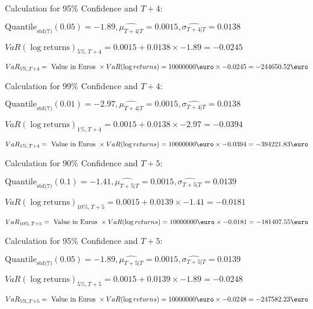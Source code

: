 Calculation for 95\% Confidence and $T+4$:

\indent\indent $\text{Quantile}_\text{std(7)}(0.05) = -1.89,\hat{\mu_{T+4|T}} = 0.0015, \hat{\sigma_{T+4|T}} = 0.0138$

\indent\indent $VaR(\log \text{returns})_{5\%, T + 4} = 0.0015 + 0.0138\times-1.89 = -0.0245$

\indent\indent $VaR_{5\%, T + 4} = \text{ Value in Euros } \times VaR(\log returns) = 10 000 000 \text{\euro} \times-0.0245 = -244650.52 \text{\euro}$\newline




Calculation for 99\% Confidence and $T+4$:

\indent\indent $\text{Quantile}_\text{std(7)}(0.01) = -2.97,\hat{\mu_{T+4|T}} = 0.0015, \hat{\sigma_{T+4|T}} = 0.0138$

\indent\indent $VaR(\log \text{returns})_{1\%, T + 4} = 0.0015 + 0.0138\times-2.97 = -0.0394$

\indent\indent $VaR_{1\%, T + 4} = \text{ Value in Euros } \times VaR(\log returns) = 10 000 000 \text{\euro} \times-0.0394 = -394221.83 \text{\euro}$\newline




Calculation for 90\% Confidence and $T+5$:

\indent\indent $\text{Quantile}_\text{std(7)}(0.1) = -1.41,\hat{\mu_{T+5|T}} = 0.0015, \hat{\sigma_{T+5|T}} = 0.0139$

\indent\indent $VaR(\log \text{returns})_{10\%, T + 5} = 0.0015 + 0.0139\times-1.41 = -0.0181$

\indent\indent $VaR_{10\%, T + 5} = \text{ Value in Euros } \times VaR(\log returns) = 10 000 000 \text{\euro} \times-0.0181 = -181407.55 \text{\euro}$\newline




Calculation for 95\% Confidence and $T+5$:

\indent\indent $\text{Quantile}_\text{std(7)}(0.05) = -1.89,\hat{\mu_{T+5|T}} = 0.0015, \hat{\sigma_{T+5|T}} = 0.0139$

\indent\indent $VaR(\log \text{returns})_{5\%, T + 5} = 0.0015 + 0.0139\times-1.89 = -0.0248$

\indent\indent $VaR_{5\%, T + 5} = \text{ Value in Euros } \times VaR(\log returns) = 10 000 000 \text{\euro} \times-0.0248 = -247582.23 \text{\euro}$\newline




